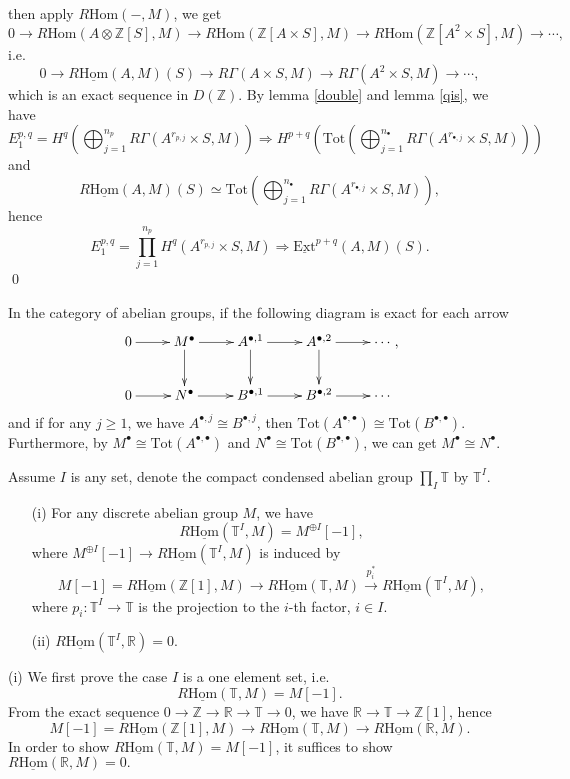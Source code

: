 \documentclass[UTF8,12,a4paper]{ctexart}
\theoremstyle{definition}
\begin{document}
then apply $R\text{Hom}(-,M)$, we get
$$
0\longrightarrow R\text{Hom}(A\otimes \mathbb{Z}[S],M)\longrightarrow R\text{Hom}(\mathbb{Z}[A\times S],M)\longrightarrow R\text{Hom}(\mathbb{Z}[A^2\times S],M)\longrightarrow\cdots,
$$
i.e.
$$
0\longrightarrow R\underline{\text{Hom}}(A,M)(S)\longrightarrow R\Gamma(A\times S,M)\longrightarrow R\Gamma(A^2\times S,M)\longrightarrow \cdots,
$$ 
which is an exact sequence in $D(\mathbb{Z})$. By lemma \ref{double} and lemma \ref{qis}, we have
$$
E_1^{p,q}=H^q(\bigoplus_{j=1}^{n_p} R\Gamma(A^{r_{p,j}}\times S,M))\Longrightarrow H^{p+q}(\text{Tot}(\bigoplus_{j=1}^{n_\bullet} R\Gamma(A^{r_{\bullet,j}}\times S,M)))
$$
and 
$$
R\underline{\text{Hom}}(A,M)(S)\simeq \text{Tot}(\bigoplus_{j=1}^{n_\bullet} R\Gamma(A^{r_{\bullet,j}}\times S,M)),
$$
hence
$$
E_1^{p,q}=\prod_{j=1}^{n_p} H^q(A^{r_{p,j}}\times S,M)\Longrightarrow \underline{\text{Ext}}^{p+q}(A,M)(S).
$$
\qed

\lem \label{exact}
In the category of abelian groups, if the following diagram is exact for each arrow
\begin{equation*}
\xymatrix{
0\ar[r] &M^\bullet\ar[d]\ar[r]&A^{\bullet,1}\ar[d]\ar[r]&A^{\bullet,2}\ar[d]\ar[r]&\cdots \\
0\ar[r] &N^\bullet\ar[r]&B^{\bullet,1}\ar[r]&B^{\bullet,2}\ar[r]&\cdots
},
\end{equation*}
and if for any $j\geq 1$, we have $A^{\bullet,j}\cong B^{\bullet,j}$, then 
$\text{Tot}(A^{\bullet,\bullet})\cong \text{Tot}(B^{\bullet,\bullet})$. Furthermore, by $M^\bullet\cong \text{Tot}(A^{\bullet,\bullet})$ and $N^\bullet\cong \text{Tot}(B^{\bullet,\bullet})$, we can get $M^\bullet\cong N^\bullet.$


\thm 
Assume $I$ is any set, denote the compact condensed abelian group $\prod_I \mathbb{T}$ by $\mathbb{T}^I$.
\begin{itemize}\label{discrete}
	\item [(i)] For any discrete abelian group $M$, we have
	$$
	R\underline{\text{Hom}}(\mathbb{T}^I,M)= M^{\oplus I}[-1],
	$$
	where $M^{\oplus I}[-1]\to R\underline{\text{Hom}}(\mathbb{T}^I,M)$ is induced by 
	$$
	M[-1]=R\underline{\text{Hom}}(\mathbb{Z}[1],M)\longrightarrow R\underline{\text{Hom}}(\mathbb{T},M)\stackrel{p_i^*}{\longrightarrow} R\underline{\text{Hom}}(\mathbb{T}^I,M),
	$$
	where $p_i:\mathbb{T}^I\longrightarrow \mathbb{T}$ is the projection to the $i$-th factor, $i\in I$.
	\label{RHom=0}\item [(ii)]
	$R\underline{\text{Hom}}(\mathbb{T}^I,\mathbb{R})=0.$	 
\end{itemize}
\pf 
\item [(i)]
We first prove the case $I$ is a one element set, i.e.
$$R\underline{\text{Hom}}(\mathbb{T},M)= M[-1].$$
From the exact sequence $0\rightarrow\mathbb{Z}\rightarrow\mathbb{R}\rightarrow\mathbb{T}\rightarrow 0$, we have $\mathbb{R}\to \mathbb{T}\to \mathbb{Z}[1]$, hence 
$$
M[-1]=
R\underline{\text{Hom}}(\mathbb{Z}[1],M)\longrightarrow R\underline{\text{Hom}}(\mathbb{T},M)\longrightarrow
R\underline{\text{Hom}}(\mathbb{R},M).
$$
In order to show $R\underline{\text{Hom}}(\mathbb{T},M)= M[-1]$, it suffices to show $R\underline{\text{Hom}}(\mathbb{R},M)= 0.$
\end{document}

